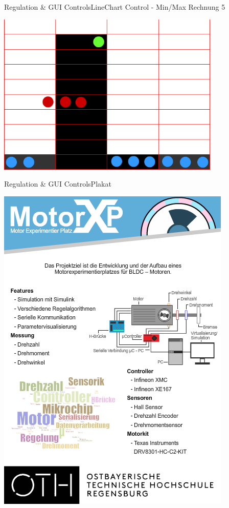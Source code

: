 	\begin{frame}{Regulation \& GUI Controls}{LineChart Control - Min/Max Rechnung 5}
	\begin{center}			
		\includegraphics[width=0.8\textwidth]{../regulation/TooManySamples030005.png}
	\end{center}
	\end{frame}


	\begin{frame}{Regulation \& GUI Controls}{Plakat}
		\begin{center}			
			\includegraphics[height=0.6\textwidth]{../regulation/Plakat.png}
		\end{center}
	\end{frame}